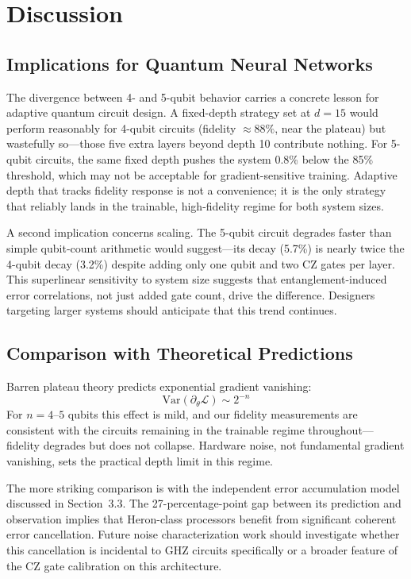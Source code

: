 \documentclass[12pt,letterpaper]{article}
\begin{document}
\section{Discussion}

\subsection{Implications for Quantum Neural Networks}

The divergence between 4- and 5-qubit behavior carries a concrete lesson for
adaptive quantum circuit design. A fixed-depth strategy set at $d = 15$ would
perform reasonably for 4-qubit circuits (fidelity $\approx 88\%$, near the plateau)
but wastefully so---those five extra layers beyond depth 10 contribute nothing.
For 5-qubit circuits, the same fixed depth pushes the system 0.8\% below the 85\%
threshold, which may not be acceptable for gradient-sensitive training. Adaptive
depth that tracks fidelity response is not a convenience; it is the only strategy
that reliably lands in the trainable, high-fidelity regime for both system sizes.

A second implication concerns scaling. The 5-qubit circuit degrades faster than
simple qubit-count arithmetic would suggest---its decay (5.7\%) is nearly twice the
4-qubit decay (3.2\%) despite adding only one qubit and two CZ gates per layer.
This superlinear sensitivity to system size suggests that entanglement-induced error
correlations, not just added gate count, drive the difference. Designers targeting
larger systems should anticipate that this trend continues.

\subsection{Comparison with Theoretical Predictions}

Barren plateau theory predicts exponential gradient vanishing:
\begin{equation}
  \mathrm{Var}\!\left(\partial_\theta \mathcal{L}\right) \sim 2^{-n}
\end{equation}
For $n = 4$--$5$ qubits this effect is mild, and our fidelity measurements are
consistent with the circuits remaining in the trainable regime throughout---fidelity
degrades but does not collapse. Hardware noise, not fundamental gradient vanishing,
sets the practical depth limit in this regime.

The more striking comparison is with the independent error accumulation model
discussed in Section~3.3. The 27-percentage-point gap between its prediction and
observation implies that Heron-class processors benefit from significant coherent
error cancellation. Future noise characterization work should investigate whether
this cancellation is incidental to GHZ circuits specifically or a broader feature
of the CZ gate calibration on this architecture.
\end{document}
